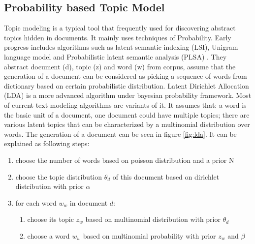 \subsection{Probability based Topic Model}
\label{sec:topic modeling}
Topic modeling is a typical tool that frequently used for discovering abstract topics hidden in documents. It mainly uses techniques of Probability. Early progress includes algorithms such as latent semantic indexing (LSI), Unigram language model and Probabilistic latent semantic analysis (PLSA) \cite{hofmann1999probabilistic, baeza1999modern}. They abstract document (d), topic (z) and word (w) from corpus, assume that the generation of a document can be considered as picking a sequence of words from dictionary based on certain probabilistic distribution. Latent Dirichlet Allocation (LDA) \cite{blei2003latent} is a more advanced algorithm under bayesian probability framework. Most of current text modeling algorithms are variants of it. It assumes that: a word is the basic unit of a document, one document could have multiple topics; there are various latent topics that can be characterized by a multinomial distribution over words. The generation of a document can be seen in figure \ref{fig:lda}. It can be explained as following steps: 
\begin{enumerate}
    \item choose the number of words based on poisson distribution and a prior N
    \item choose the topic distribution {$\theta_d$} of this document based on dirichlet distribution with prior {$\alpha$}
    \item for each word {$w_w$} in document {$d$}:
    \begin{enumerate}
        \item choose its topic {$z_w$} based on multinomial distribution with prior {$\theta_d$}
        \item choose a word {$w_w$} based on multinomial probability with prior {$z_w$} and {$\beta$}
    \end{enumerate}
\end{enumerate}
